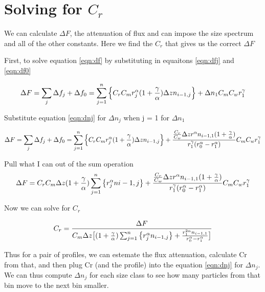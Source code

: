 \documentclass[a4paper,12pt]{article}
\begin{document}
\section{Solving for $C_r$}

We can calculate $\Delta F $, the attenuation of flux and can impose the size spectrum and all of the other constants. Here we find the $C_r$ that gives us the correct $\Delta F $

First, to solve equation \ref{eqn:df} by substituting in equaitons \ref{eqn:dfj} and \ref{eqn:df0}

\begin{equation}
\Delta F = \sum_j \Delta f_j + \Delta f_0 = 
\sum_{j = 1}^n \left\{C_r C_m r_j^\alpha(1+{\gamma \over \alpha}) \Delta z n_{i-1,j} \right\} +
\Delta n_1 C_m C_w r_1^\gamma
\end{equation}

Substitute equation \ref{eqn:dnj} for $\Delta n_j$ when j = 1 for $\Delta n_1$

\begin{equation}
\Delta F = \sum_j \Delta f_j + \Delta f_0 = 
\sum_{j = 1}^n \left\{C_r C_m r_j^\alpha(1+{\gamma \over \alpha}) \Delta z n_{i-1,j} \right\} +
 {{{C_r \over C_w} \Delta z r^{\alpha} n_{i-1,1}(1 + {\gamma \over \alpha})} \over {r_1^\gamma(r_{0}^\alpha - r_1^\alpha})}
C_m C_w r_1^\gamma
\end{equation}

Pull what I can out of the sum operation
\begin{equation}
\Delta F =
C_r C_m \Delta z (1 + {\gamma \over \alpha}) \sum_{j = 1}^n \left\{r_j^\alpha n{i-1,j} \right\}
+
 {{{C_r \over C_w} \Delta z r^{\alpha} n_{i-1,1}(1 + {\gamma \over \alpha})} \over {r_1^\gamma(r_{0}^\alpha - r_1^\alpha})}
C_m C_w r_1^\gamma
\end{equation}

Now we can solve for $C_r$

\begin{equation}
C_r = {
\Delta F \over 
C_m \Delta z \big[
(1 + {\gamma \over \alpha}) \sum_{j = 1}^n  \big\{
r_j^\alpha n_{i-1,j}
\big\} +
{{r_1^{2\alpha}n_{i-1,1}}\over{r_0^\alpha - r_1^\alpha}}
\big]
}
\end{equation}

Thus for a pair of profiles, we can estemate the flux attenuation, calculate Cr from that, and then plug Cr (and the profile) into the equation \ref{eqn:dnj} for $\Delta n_j$. We can thus compute $\Delta n_j$ for each size class to see how many particles from that bin move to the next bin smaller.



 
\end{document}
